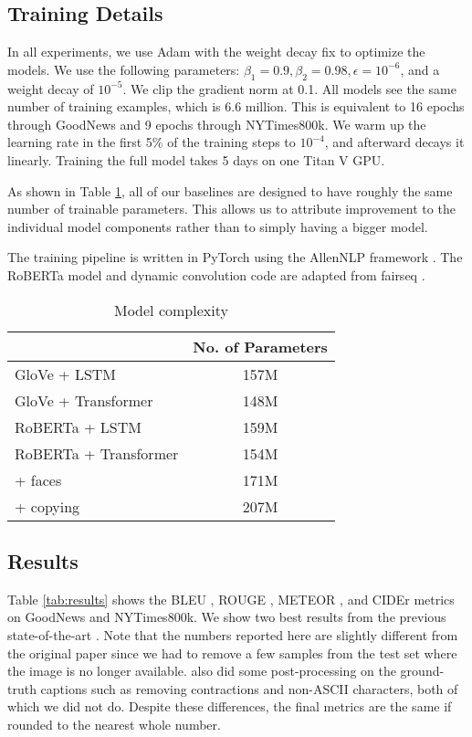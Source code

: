 \subsection{Training Details}

In all experiments, we use Adam \cite{Kingma2015Adam} with the weight decay fix
\cite{Loshchilov2018DecoupledWD} to optimize the models. We use the following
parameters: $\beta_1 = 0.9, \beta_2 = 0.98, \epsilon = 10^{-6}$, and a weight
decay of $10^{-5}$. We clip the gradient norm at 0.1. All models see the same
number of training examples, which is 6.6 million. This is equivalent to 16
epochs through GoodNews and 9 epochs through NYTimes800k. We warm up the
learning rate in the first 5\% of the training steps to $10^{-4}$, and
afterward decays it linearly. Training the full model takes 5 days on one Titan
V GPU.

As shown in Table \ref{tab:models}, all of our baselines are designed to have
roughly the same number of trainable parameters. This allows us to attribute
improvement to the individual model components rather than to simply having a
bigger model.

The training pipeline is written in PyTorch \cite{Paszke2017Automatic} using
the AllenNLP framework \cite{Gardner2017AllenNLP}. The RoBERTa model and
dynamic convolution code are adapted from fairseq \cite{Ott2019Fairseq}.

\begin{table}[t]
	\caption {Model complexity}
	\label{tab:models}
	\centering
	\begin{tabularx}{\linewidth}{Xc}
		\toprule
        & No. of Parameters \\
      \midrule
      GloVe + LSTM & 157M \\
      GloVe + Transformer & 148M \\
      RoBERTa + LSTM & 159M \\
      RoBERTa + Transformer & 154M \\
      \quad + faces & 171M \\
      \quad\quad + copying & 207M \\
		\bottomrule
	\end{tabularx}
\end{table}

\subsection{Results}


Table \ref{tab:results} shows the BLEU \cite{Papineni2002Bleu}, ROUGE
\cite{Lin2004ROUGE}, METEOR \cite{Denkowski2014Meteor}, and CIDEr
\cite{Vedantam2015CIDEr} metrics on GoodNews and NYTimes800k. We show two best
results from the previous state-of-the-art \cite{Biten2019GoodNews}. Note that
the numbers reported here are slightly different from the original paper since
we had to remove a few samples from the test set where the image is no longer
available. \cite{Biten2019GoodNews} also did some post-processing on the
ground-truth captions such as removing contractions and non-ASCII characters,
both of which we did not do. Despite these differences, the final metrics
are the same if rounded to the nearest whole number.

